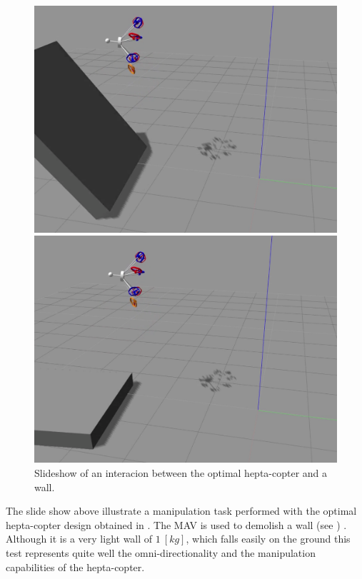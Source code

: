 \begin{figure}[!ht]
\begin{center}
\begin{minipage}[t]{0.495\textwidth}
      \includegraphics[width=\linewidth]{images/Selection_024.png}
    \end{minipage}
    \hfill
    \begin{minipage}[t]{0.495\textwidth}
      \includegraphics[width=\linewidth]{images/Selection_026.png}
    \end{minipage}
    \caption{Slideshow of an interacion between the optimal hepta-copter and a wall.}
    \label{fig:hepta_sim}
  \end{center}
\end{figure}

The slide show above illustrate a manipulation task performed with the optimal
hepta-copter design obtained in . The MAV is used to
demolish a wall (see ) . Although it is a very light wall of
$1\ [kg]$, which falls easily on the ground this test represents quite well the
omni-directionality and the manipulation capabilities of the hepta-copter.
